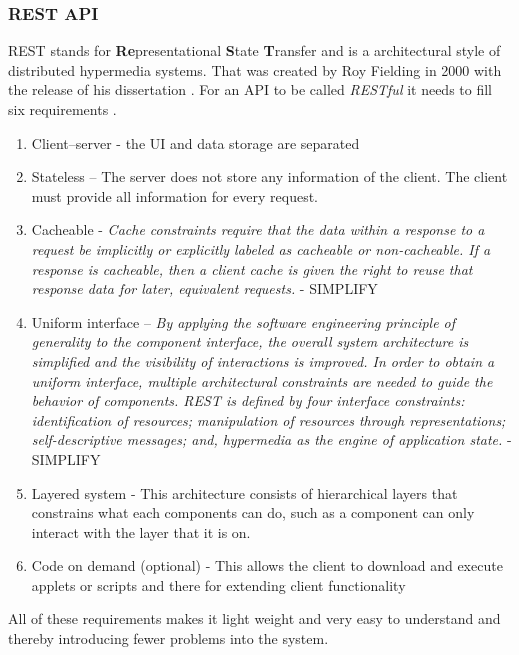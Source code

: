 \subsubsection{REST API}%
\label{sub:REST API}
REST stands for \textbf{Re}presentational \textbf{S}tate \textbf{T}ransfer and is a architectural style of distributed hypermedia systems. That was created by Roy Fielding in 2000 with the release of his dissertation \cite{fieldingFieldingDissertationCHAPTER}. For an API to be called \textit{RESTful} it needs to fill six requirements \cite{restfulapi.netWhatREST}.
\begin{enumerate}
  \item Client–server - the UI and data storage are separated
  \item Stateless –  The server does not store any information of the client. The client must provide all information for every request. 
  \item Cacheable - \textit{Cache constraints require that the data within a response to a request be implicitly or explicitly labeled as cacheable or non-cacheable. If a response is cacheable, then a client cache is given the right to reuse that response data for later, equivalent requests.} - SIMPLIFY
  \item Uniform interface – \textit{By applying the software engineering principle of generality to the component interface, the overall system architecture is simplified and the visibility of interactions is improved. In order to obtain a uniform interface, multiple architectural constraints are needed to guide the behavior of components. REST is defined by four interface constraints: identification of resources; manipulation of resources through representations; self-descriptive messages; and, hypermedia as the engine of application state.} - SIMPLIFY
  \item Layered system -  This architecture consists of hierarchical layers that constrains what each components can do, such as a component can only interact with the layer that it is on.
  \item  Code on demand (optional) - This allows the client to download and execute applets or scripts and there for extending client functionality
\end{enumerate}


 
All of these requirements makes it light weight and very easy to understand and thereby introducing fewer problems into the system.  




